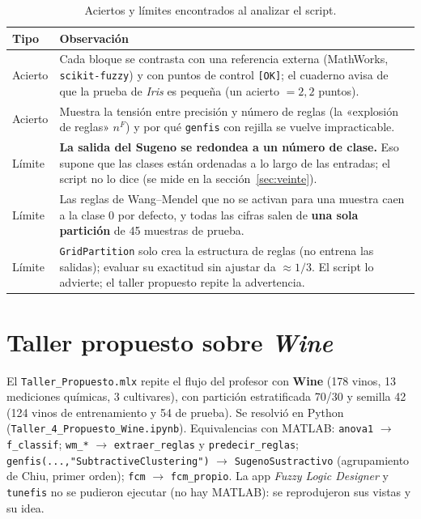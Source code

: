 \documentclass[11pt,letterpaper]{article}
\begin{document}
\begin{table}[H]
\centering\small
\caption{Aciertos y límites encontrados al analizar el script.}
\begin{tabularx}{\linewidth}{@{}l L@{}}
\toprule
Tipo & Observación \\
\midrule
Acierto & Cada bloque se contrasta con una referencia externa (MathWorks, \texttt{scikit-fuzzy}) y con puntos de control \texttt{[OK]}; el cuaderno avisa de que la prueba de \textit{Iris} es pequeña (un acierto $=2{,}2$ puntos). \\
Acierto & Muestra la tensión entre precisión y número de reglas (la «explosión de reglas» $n^F$) y por qué \texttt{genfis} con rejilla se vuelve impracticable. \\
Límite & \textbf{La salida del Sugeno se redondea a un número de clase.} Eso supone que las clases están ordenadas a lo largo de las entradas; el script no lo dice (se mide en la sección~\ref{sec:veinte}). \\
Límite & Las reglas de Wang--Mendel que no se activan para una muestra caen a la clase 0 por defecto, y todas las cifras salen de \textbf{una sola partición} de 45 muestras de prueba. \\
Límite & \texttt{GridPartition} solo crea la estructura de reglas (no entrena las salidas); evaluar su exactitud sin ajustar da $\approx 1/3$. El script lo advierte; el taller propuesto repite la advertencia. \\
\bottomrule
\end{tabularx}
\end{table}

\section{Taller propuesto sobre \textit{Wine}}

El \texttt{Taller\_Propuesto.mlx} repite el flujo del profesor con \textbf{Wine} (178 vinos, 13 mediciones químicas, 3 cultivares), con partición estratificada 70/30 y semilla 42 (124 vinos de entrenamiento y 54 de prueba).
Se resolvió en Python (\texttt{Taller\_4\_Propuesto\_Wine.ipynb}). Equivalencias con MATLAB: \texttt{anova1} $\to$ \texttt{f\_classif}; \texttt{wm\_*} $\to$ \texttt{extraer\_reglas} y \texttt{predecir\_reglas}; \texttt{genfis(...,"SubtractiveClustering")} $\to$ \texttt{SugenoSustractivo}
(agrupamiento de Chiu, primer orden); \texttt{fcm} $\to$ \texttt{fcm\_propio}. La app \textit{Fuzzy Logic Designer} y \texttt{tunefis} no se pudieron ejecutar (no hay MATLAB): se reprodujeron sus vistas y su idea.
\end{document}
